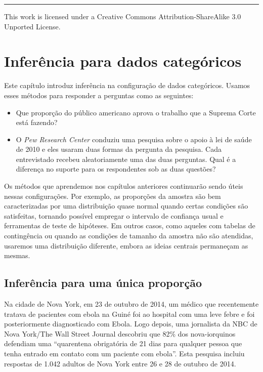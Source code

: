 \documentclass[
]{book}
\theoremstyle{definition}
\theoremstyle{definition}
\theoremstyle{definition}
\theoremstyle{definition}
\theoremstyle{remark}
\begin{document}
\begin{center}\rule{0.5\linewidth}{0.5pt}\end{center}

This work is licensed under a Creative Commons Attribution-ShareAlike 3.0 Unported License.

\hypertarget{ch6-inf-cat}{%
\chapter{Inferência para dados categóricos}\label{ch6-inf-cat}}

Este capítulo introduz inferência na configuração de dados categóricos. Usamos esses métodos para responder a perguntas como as seguintes:

\begin{itemize}
\item
  Que proporção do público americano aprova o trabalho que a Suprema Corte está fazendo?
\item
  O \emph{Pew Research Center} conduziu uma pesquisa sobre o apoio à lei de saúde de 2010 e eles usaram duas formas da pergunta da pesquisa. Cada entrevistado recebeu aleatoriamente uma das duas perguntas. Qual é a diferença no suporte para os respondentes sob as duas questões?
\end{itemize}

Os métodos que aprendemos nos capítulos anteriores continuarão sendo úteis nessas configurações. Por exemplo, as proporções da amostra são bem caracterizadas por uma distribuição quase normal quando certas condições são satisfeitas, tornando possível empregar o intervalo de confiança usual e ferramentas de teste de hipóteses. Em outros casos, como aqueles com tabelas de contingência ou quando as condições de tamanho da amostra não são atendidas, usaremos uma distribuição diferente, embora as ideias centrais permaneçam as mesmas.

\hypertarget{inferenceSingleProportion}{%
\section{Inferência para uma única proporção}\label{inferenceSingleProportion}}

Na cidade de Nova York, em 23 de outubro de 2014, um médico que recentemente tratava de pacientes com ebola na Guiné foi ao hospital com uma leve febre e foi posteriormente diagnosticado com Ebola. Logo depois, uma jornalista da NBC de Nova York/The Wall Street Journal descobriu que 82\% dos nova-iorquinos defendiam uma ``quarentena obrigatória de 21 dias para qualquer pessoa que tenha entrado em contato com um paciente com ebola''. Esta pesquisa incluiu respostas de 1.042 adultos de Nova York entre 26 e 28 de outubro de 2014.
\end{document}

